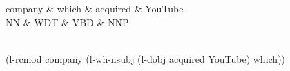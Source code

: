 \documentclass{article}
\begin{document}
\thispagestyle{empty}
\begin{center}
 \begin{dependency}[theme = default]
   \begin{deptext}[column sep=1em]
   company \& which \& acquired \& YouTube \\
   NN \& WDT \& VBD \& NNP \\
   \end{deptext}
\end{dependency} \\
(l-rcmod company (l-wh-nsubj (l-dobj acquired YouTube) which))
\end{center}
\end{document}
